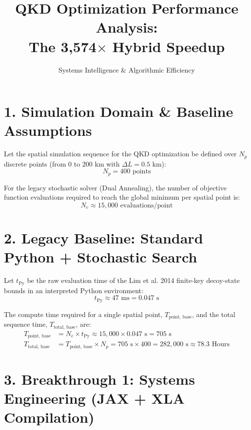 \documentclass[11pt, letterpaper]{article}
\title{\vspace{-2cm}\textbf{QKD Optimization Performance Analysis:\\ The 3,574$\times$ Hybrid Speedup}}
\author{Systems Intelligence \& Algorithmic Efficiency}
\date{}
\begin{document}
\maketitle
\vspace{-1.5cm}

\section*{1. Simulation Domain \& Baseline Assumptions}

Let the spatial simulation sequence for the QKD optimization be defined over $N_p$ discrete points (from $0$ to $200$ km with $\Delta L = 0.5$ km):
\begin{equation}
N_p = 400 \text{ points}
\end{equation}

For the legacy stochastic solver (Dual Annealing), the number of objective function evaluations required to reach the global minimum per spatial point is:
\begin{equation}
N_e \approx 15,000 \text{ evaluations/point}
\end{equation}


\section*{2. Legacy Baseline: Standard Python + Stochastic Search}

Let $t_{\text{Py}}$ be the raw evaluation time of the Lim et al. 2014 finite-key decoy-state bounds in an interpreted Python environment:
\begin{equation}
t_{\text{Py}} \approx 47 \text{ ms} = 0.047 \text{ s}
\end{equation}

The compute time required for a single spatial point, $T_{\text{point, base}}$, and the total sequence time, $T_{\text{total, base}}$, are:
\begin{align}
T_{\text{point, base}} &= N_e \times t_{\text{Py}} \approx 15,000 \times 0.047 \text{ s} = 705 \text{ s} \\
T_{\text{total, base}} &= T_{\text{point, base}} \times N_p = 705 \text{ s} \times 400 = 282,000 \text{ s} \approx 78.3 \text{ Hours}
\end{align}


\section*{3. Breakthrough 1: Systems Engineering (JAX + XLA Compilation)}
\end{document}
